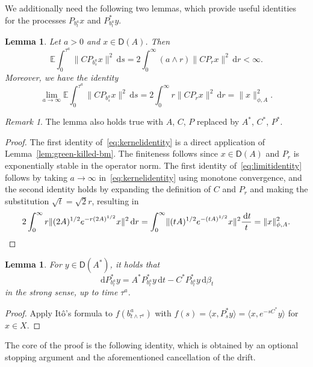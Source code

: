 \documentclass[11pt]{amsart}
\newtheorem{lemma}[theorem]{Lemma}
\theoremstyle{definition}
\theoremstyle{remark}
\newtheorem{remark}[theorem]{Remark}
\numberwithin{equation}{section}
\newcommand{\E}{\mathbb E}
\newcommand{\1}{\mathbf 1}
\newcommand{\cD}{\mathsf D}
\newcommand{\norm}[1]{\lVert #1\rVert}
\newcommand{\dd}{\,\mathrm d}
\begin{document}
We additionally need the following two lemmas, which provide useful identities for the processes $P_{b^a_t}x$ and $P_{b^a_t}^*y$.
\begin{lemma}
    \label{lem:integrable}
Let $a>0$ and $x\in \cD(A)$. Then 
    \begin{equation}
        \label{eq:kernelidentity}
        \E \int_0^{\tau^a} \norm{C P_{b^a_s}x}^2 \dd s = 2 \int_0^{\infty} (a \wedge r) \norm{C P_{r}x}^2 \dd r < \infty.
    \end{equation}
    Moreover, we have the identity
    \begin{equation}
        \label{eq:limitidentity}
        \lim_{a\to \infty}\E \int_0^{\tau^a} \norm{C P_{b^a_s} x}^2 \dd s = 
        2 \int_0^{\infty} r \norm{C P_{r}x}^2 \dd r 
        = \norm{x}_{\phi,A}^2.
    \end{equation}
\end{lemma}
\begin{remark}
    \label{rem:integrable}
    The lemma also holds true with $A$, $C$, $P$ replaced by $A^*$, $C^*$, $P^*$.
\end{remark}
\begin{proof}
    The first identity of~\eqref{eq:kernelidentity} is a direct application of Lemma~\ref{lem:green-killed-bm}.
    The finiteness follows since $x \in \cD(A)$ and $P_r$ is exponentially stable in the operator norm. 
The first identity of~\eqref{eq:limitidentity} follows by taking $a \to \infty$ in~\eqref{eq:kernelidentity} using monotone convergence, and the second identity holds by expanding the definition of $C$ and $P_{r}$ and making the substitution $\sqrt{t} = \sqrt{2}r$, resulting in
\begin{equation*}
    2 \int_0^{\infty} r \norm{(2A)^{1/2} e^{-r(2A)^{1/2}}x}^2 \dd r = \int_0^{\infty} \norm{(tA)^{1/2}e^{-(tA)^{1/2}}x}^2 \frac{\dd t}{t} = \norm{x}_{\phi,A}^2. \qedhere
\end{equation*}
\end{proof}

\begin{lemma}
    For $y \in \cD(A^*)$, it holds that
    \begin{equation}
        \label{eq:itoPbt}
        \dd P_{b^a_t}^*y = A^* P_{b^a_t}^* y \dd t - C^* P^*_{b^a_t}y \dd \beta_t
    \end{equation}
    in the strong sense, up to time $\tau^a$.
\end{lemma}
\begin{proof}
    Apply It\^o's formula to $f(b^a_{t \wedge \tau^a})$ with $f(s) = \langle x, P^*_{s} y\rangle = \langle x, e^{-s C^*}y\rangle$ for $x \in X$. 
\end{proof}
The core of the proof is the following identity, which is obtained by an optional stopping argument and the aforementioned cancellation of the drift.
\end{document}

